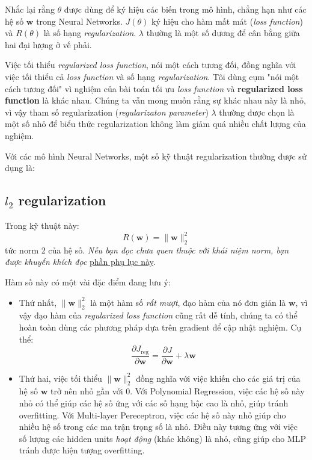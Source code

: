 Nhắc lại rằng $\theta$ được dùng để ký hiệu các biến trong mô hình, chẳng hạn như các hệ số $\mathbf{w}$ trong Neural Networks. $J(\theta)$ ký hiệu cho hàm mất mát (\textit{loss function}) và $R(\theta)$ là số hạng \textit{regularization}. $\lambda$ thường là một số dương để cân bằng giữa hai đại lượng ở vế phải. 
 
 
Việc tối thiểu \textit{regularized loss function}, nói một cách tương đối, đồng nghĩa với việc tối thiểu cả \textit{loss function} và số hạng \textit{regularization}. Tôi dùng cụm "nói một cách tương đối" vì nghiệm của bài toán tối ưu \textit{loss function} và \textbf{regularized loss function} là khác nhau.  Chúng ta vẫn mong muốn rằng sự khác nhau này là nhỏ, vì vậy tham số regularization (\textit{regularizaton parameter}) $\lambda$ thường được chọn là một số nhỏ để biểu thức regularization không làm giảm quá nhiều chất lượng của nghiệm. 
 
Với các mô hình Neural Networks, một số kỹ thuật regularization thường được sử dụng là: 
 
 
\subsection{$l_2$ regularization}
Trong kỹ thuật này: 
\begin{equation*} 
R(\mathbf{w}) = \|\mathbf{w}\|_2^2 
\end{equation*} 
tức norm 2 của hệ số. 
\textit{Nếu bạn đọc chưa quen thuộc với khái niệm norm, bạn được khuyến khích đọc} \href{http://machinelearningcoban.com/math/#norms-chuan}{phần phụ lục này}.
 
Hàm số này có một vài đặc điểm đang lưu ý: 
 
\begin{itemize}
    \item Thứ nhất, $\|\mathbf{w}\|_2^2$ là một hàm số \textit{rất mượt}, đạo hàm của nó đơn giản là $\mathbf{w}$, vì vậy đạo hàm của \textit{regularized loss function} cũng rất dễ tính, chúng ta có thể hoàn toàn dùng các phương pháp dựa trên gradient để cập nhật nghiệm. Cụ thể: 
    \begin{equation*} 
    \frac{\partial J_{\text{reg}} }{\partial \mathbf{w}} = \frac{\partial J}{\partial \mathbf{w}} + \lambda \mathbf{w} 
    \end{equation*} 
    \item Thứ hai, việc tối thiểu $\|\mathbf{w}\|_2^2$ đồng nghĩa với việc khiến cho các giá trị của hệ số $\mathbf{w}$ trở nên nhỏ gần với 0. Với Polynomial Regression, việc các hệ số này nhỏ có thể giúp các hệ số ứng với các số hạng bậc cao là nhỏ, giúp tránh overfitting. Với Multi-layer Pereceptron, việc các hệ số này nhỏ giúp cho nhiều hệ số trong các ma trận trọng số là nhỏ. Điều này tương ứng với việc số lượng các hidden units \textit{hoạt động} (khác không) là nhỏ, cũng giúp cho MLP tránh được hiện tượng overfitting. 
\end{itemize}
 
